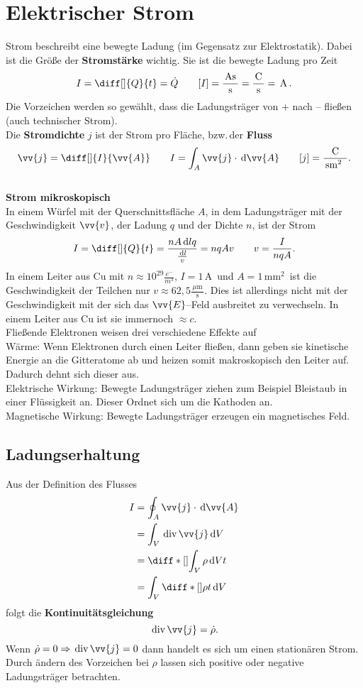 \documentclass[a4paper,12pt]{article}
\newcommand{\td}{\,\text{d}}
\begin{document}
\newpage
\section{Elektrischer Strom}
Strom beschreibt eine bewegte Ladung (im Gegensatz zur Elektrostatik). Dabei ist die Größe der \textbf{Stromstärke} wichtig. Sie ist die bewegte Ladung pro Zeit
\[ 
        I=\diff[]{Q}{t}=\dot{Q}\qquad [I]=\dfrac{\,\text{As}\,}{\,\text{s}\,}=\dfrac{\,\text{C}\,}{\,\text{s}\,}=\,\text{A}\,
.\] 
Die Vorzeichen werden so gewählt, dass die Ladungsträger von $+$ nach -- fließen (auch technischer Strom).\\\indent
Die \textbf{Stromdichte} $j$ ist der Strom pro Fläche, bzw.\,der \textbf{Fluss} 
\[ 
        \vv{j}=\diff[]{I}{\vv{A}}\qquad I=\int_{A}^{}\vv{j}\cdot \td \vv{A}\qquad [j]=\dfrac{\,\text{C}\,}{\,\text{sm$^2$ }\,}
.\] 
\hfill\\\textbf{Strom mikroskopisch}\\ 
In einem Würfel mit der Querschnittsfläche $A$, in dem Ladungsträger mit der Geschwindigkeit $\vv{v}$, der Ladung $q$ und der Dichte $n$, ist der Strom
\[ 
        I=\diff[]{Q}{t}=\dfrac{nA\td lq}{\tfrac{\td l}{v}}=nqAv\qquad v=\dfrac{I}{nqA}
.\] 
In einem Leiter aus Cu mit $n\approx 10^{29}\tfrac{e^-}{m^3}$, $I=1\,\text{A}\,$ und $A=1\,\text{mm$^2$}\,$ ist die Geschwindigkeit der Teilchen nur $v\approx 62,5\tfrac{\,\text{$\mu $m}\,}{\,\text{s}\,}$. Dies ist allerdings nicht mit der Geschwindigkeit mit der sich das $\vv{E}$--Feld ausbreitet zu verwechseln. In einem Leiter aus Cu ist sie immernoch $\approx c$.\\ Fließende Elektronen weisen drei verschiedene Effekte auf\\\indent
Wärme: Wenn Elektronen durch einen Leiter fließen, dann geben sie kinetische Energie an die Gitteratome ab und heizen somit makroskopisch den Leiter auf. Dadurch dehnt sich dieser aus.\\\indent
Elektrische Wirkung: Bewegte Ladungsträger ziehen zum Beispiel Bleistaub in einer Flüssigkeit an. Dieser Ordnet sich um die Kathoden an.\\\indent
Magnetische Wirkung: Bewegte Ladungsträger erzeugen ein magnetisches Feld.

\subsection{Ladungserhaltung}
Aus der Definition des Flusses
\begin{align*}
        I&=\oint_{A}^{}\vv{j}\cdot \td \vv{A}\\
         &=\int_{V}^{}\,\text{div}\,\vv{j}\td V\\
         &=\diff*[]{\int_{V}^{}\rho \td V}{t}\\
         &=\int_{V}^{}\diff*[]{\rho }{t}\td V
\end{align*}
folgt die \textbf{Kontinuitätsgleichung} 
\[ 
        \,\text{div}\,\vv{j}=\dot{\rho }
.\] 
Wenn $\dot{\rho }=0\Rightarrow \,\text{div}\,\vv{j}=0$ dann handelt es sich um einen stationären Strom. Durch ändern des Vorzeichen bei $\rho $ lassen sich positive oder negative Ladungsträger betrachten.
\end{document}
